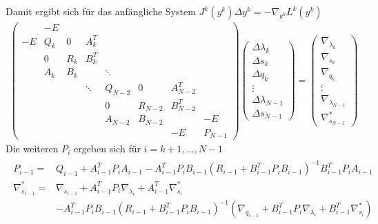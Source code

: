   Damit ergibt sich für das anfängliche System $ J^{k}(y^{k})\Delta y^{k} = -\nabla_{y^{k}} L^{k}(y^{k})$
  \begin{align*}
  \begin{pmatrix}
    & -E &   &   &   &   &   &      \\
  -E& Q_k & 0  &  A_k^{T} &  &   &    &       \\
    & 0   & R_k & B_k^{T} &  &   &   &      \\
    & A_k & B_k &     & \ddots &   &   &    \\
    &  &  & \ddots & Q_{N-2} & 0 & A_{N-2}^{T}  &     \\
    &  &  &        &  0      & R_{N-2}  & B_{N-2}^{T}  &     \\
    &  &  &        & A_{N-2} & B_{N-2}  &     & -E \\
    &  &  &  &  &  & -E & P_{N-1}
  \end{pmatrix}
  \begin{pmatrix}
  \Delta \lambda_{k} \\
  \Delta s_{k} \\
  \Delta q_{k} \\
  \vdots \\
  \Delta \lambda_{N-1} \\
  \Delta s_{N-1} 
  \end{pmatrix} =
  \begin{pmatrix}
  \nabla_{\lambda_{k}} \\
  \nabla_{s_{k}} \\ 
  \nabla_{q_{k}} \\
  \vdots \\
  \nabla_{\lambda_{N-1}} \\
  \nabla_{s_{N-1}}^{*}
  \end{pmatrix}
  \end{align*}
  Die weiteren $P_i $ ergeben sich für $ i = k+1, ..., N-1$
  \begin{align*}
  \begin{array}{rl}
  P_{i-1} = & Q_{i-1}+A_{i-1}^{T}P_i A_{i-1} -A_{i-1}^{T}P_i B_{i-1}
  (R_{i-1}+B_{i-1}^{T}P_i B_{i-1})^{-1} B_{i-1}^{T}P_i A_{i-1} \\
  \nabla_{s_{i-1}}^{*} = & \nabla_{s_{i-1}} + A_{i-1}^{T}P_i \nabla_{\lambda_{i}} + A_{i-1}^{T}\nabla_{s_{i}}^{*} \\
   & - A_{i-1}^{T}P_i B_{i-1}(R_{i-1}+B_{i-1}^{T}P_i B_{i-1})^{-1}(\nabla_{q_{i-1}} +B_{i-1}^{T}P_i \nabla_{\lambda_{i}} +B_{i-1}^{T}\nabla_{s_{i}}^{*})
  \end{array}
  \end{align*}
